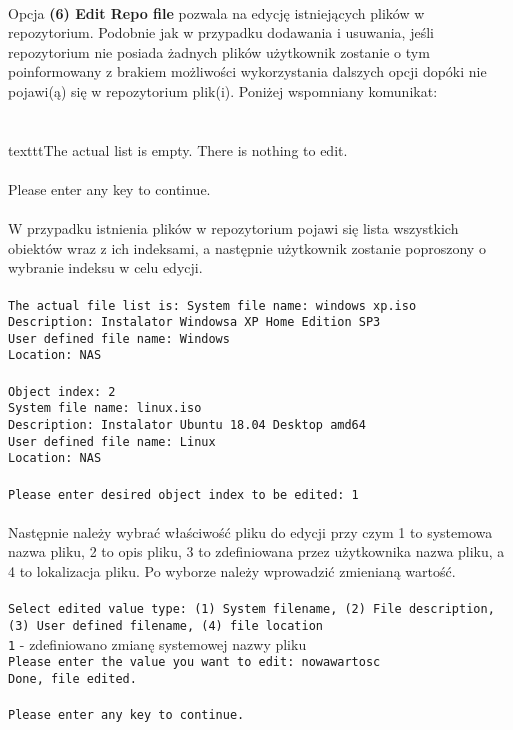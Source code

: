\documentclass[10pt, a4paper]{article}
\begin{document}
\\
Opcja \textbf{(6) Edit Repo file} pozwala na edycję istniejących plików w repozytorium. Podobnie jak w przypadku dodawania i usuwania, jeśli repozytorium nie posiada żadnych plików użytkownik zostanie o tym poinformowany z brakiem możliwości wykorzystania dalszych opcji dopóki nie pojawi(ą) się w repozytorium plik(i). Poniżej wspomniany komunikat:\\
\\
\\texttt{The actual list is empty. There is nothing to edit.\\
\\
Please enter any key to continue.}\\
\\
W przypadku istnienia plików w repozytorium pojawi się lista wszystkich obiektów wraz z ich indeksami, a następnie użytkownik zostanie poproszony o wybranie indeksu w celu edycji.\\
\\
\texttt{The actual file list is:
System file name: windows xp.iso\\
Description: Instalator Windowsa XP Home Edition SP3\\
User defined file name: Windows\\
Location: NAS\\
\\
Object index: 2\\
System file name: linux.iso\\
Description: Instalator Ubuntu 18.04 Desktop amd64\\
User defined file name: Linux\\
Location: NAS\\
\\
Please enter desired object index to be edited: 1\\
}\\
Następnie należy wybrać właściwość pliku do edycji przy czym 1 to systemowa nazwa pliku, 2 to opis pliku, 3 to zdefiniowana przez użytkownika nazwa pliku, a 4 to lokalizacja pliku. Po wyborze należy wprowadzić zmienianą wartość.\\
\\
\texttt{Select edited value type: (1) System filename, (2) File description, (3) User defined filename, (4) file location\\
1} - zdefiniowano zmianę systemowej nazwy pliku\\
\texttt{Please enter the value you want to edit: nowawartosc\\
Done, file edited.\\
\\
Please enter any key to continue.}\\
\end{document}
